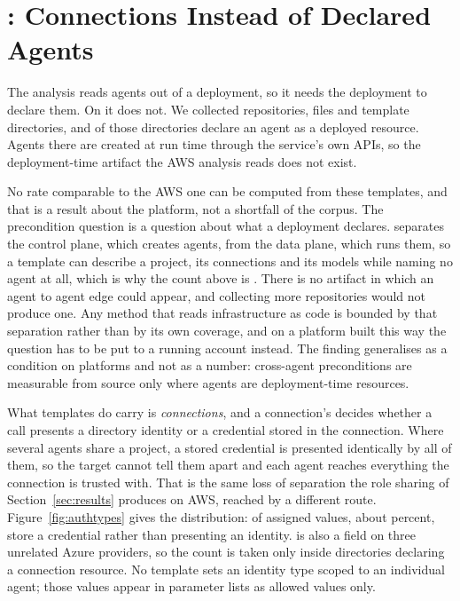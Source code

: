 \section{\foundry: Connections Instead of Declared Agents}
\label{sec:foundry}

The analysis reads agents out of a deployment, so it needs the deployment to
declare them. On \foundry it does not. We collected \nFoundryRepos
repositories, \nFoundryFiles files and \nFoundryDirs template directories, and
\nFoundryAgentDirs of those directories declare an agent as a deployed
resource. Agents there are created at run time through the service's own APIs,
so the deployment-time artifact the AWS analysis reads does not exist.

No rate comparable to the AWS one can be computed from these templates, and
that is a result about the platform, not a shortfall of the corpus. The
precondition question is a question about what a deployment declares.
\foundry separates the control plane, which creates agents, from the data
plane, which runs them, so a template can describe a project, its connections
and its models while naming no agent at all, which is why the count above is
\nFoundryAgentDirs. There is no artifact in which an agent to agent edge could
appear, and collecting more repositories would not produce one. Any method
that reads infrastructure as code is bounded by that separation rather than by
its own coverage, and on a platform built this way the question has to be put
to a running account instead. The finding generalises as a condition on
platforms and not as a number: cross-agent preconditions are measurable
from source only where agents are deployment-time resources.

What \foundry templates do carry is \emph{connections}, and a connection's
 decides whether a call presents a directory identity or a
credential stored in the connection. Where several agents share a project, a
stored credential is presented identically by all of them, so the target
cannot tell them apart and each agent reaches everything the connection is
trusted with. That is the same loss of separation the role sharing of
Section~\ref{sec:results} produces on AWS, reached by a different route.
Figure~\ref{fig:authtypes} gives the distribution:
\nAuthStoredCredential of \nFoundryAuthValues assigned values, about
\pctAuthStoredCredential percent, store a credential rather than presenting an
identity.  is also a field on three unrelated Azure providers,
so the count is taken only inside directories declaring a connection resource.
No template sets an identity type scoped to an individual agent; those values
appear in parameter lists as allowed values only.



